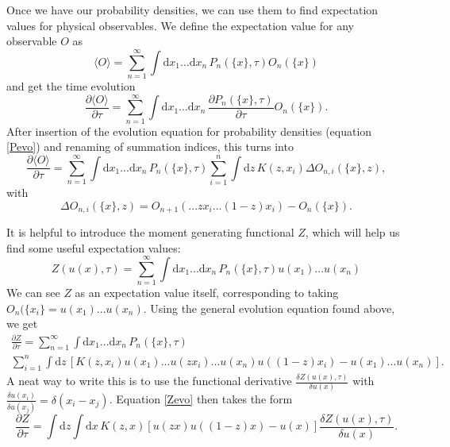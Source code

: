 \documentclass[a4paper,12pt]{article}
\newcommand{\party}[2]{\frac{\partial{#1}}{\partial{#2}}}
\numberwithin{equation}{section}
\begin{document}
Once we have our probability densities, we can use them to find expectation values for physical observables. We define the expectation value for any observable $O$ as
\begin{equation}
\langle O \rangle = \sum_{n=1}^\infty \int \mathrm{d}x_1...\mathrm{d}x_n \, P_n(\{x\},\tau) O_n(\{x\})
\end{equation}
and get the time evolution 
\begin{equation}
\party{\langle O \rangle}{\tau}=\sum_{n=1}^\infty \int \mathrm{d}x_1...\mathrm{d}x_n \, \party{P_n(\{x\},\tau)}{\tau} O_n(\{x\}).
\end{equation}
%
After insertion of the evolution equation for probability densities (equation \eqref{Pevo}) and renaming of summation indices, this turns into
%
\begin{equation}
\party{\langle O \rangle}{\tau}=\sum_{n=1}^\infty \int \mathrm{d}x_1...\mathrm{d}x_n\, P_n(\{x\},\tau) \sum_{i=1}^n \int \mathrm{d}z\, K(z,x_i) \Delta O_{n,i}(\{x\},z),
\end{equation}
with
\begin{equation}
\Delta O_{n,i}(\{x\},z)=O_{n+1}(...zx_i...(1-z)x_i)-O_n(\{x\}).
\end{equation}


It is helpful to introduce the moment generating functional $Z$, which will help us find some useful expectation values:
\begin{equation}
Z(u(x),\tau)=\sum_{n=1}^\infty \int \mathrm{d}x_1...\mathrm{d}x_n\, P_n(\{x\},\tau) u(x_1)...u(x_n)
\end{equation}
We can see $Z$ as an expectation value itself, corresponding to taking $O_n(\{x_i\}=u(x_1)...u(x_n)$. Using the general evolution equation found above, we get
\begin{multline}\label{Zevo}
\party{Z}{\tau}=\sum_{n=1}^\infty \int \mathrm{d}x_1...\mathrm{d}x_n\, P_n(\{x\},\tau)\\
 \sum_{i=1}^n \int \mathrm{d}z\, [ K(z,x_i)
u(x_1)...u(zx_i)...u(x_n)u((1-z)x_i) 
- u(x_1)...u(x_n) ].
\end{multline}
A neat way to write this is to use the functional derivative $\frac{\delta Z(u(x),\tau)}{\delta u(x)}$ with $\frac{\delta u(x_i)}{\delta u(x_j)}=\delta(x_i-x_j)$. Equation \eqref{Zevo} then takes the form
\begin{equation}
\party{Z}{\tau}=\int \mathrm{d}z \int \mathrm{d}x \, K(z,x) [u(zx)u((1-z)x) - u(x)]\frac{\delta Z(u(x),\tau)}{\delta u(x)}.
\end{equation}
\end{document}
